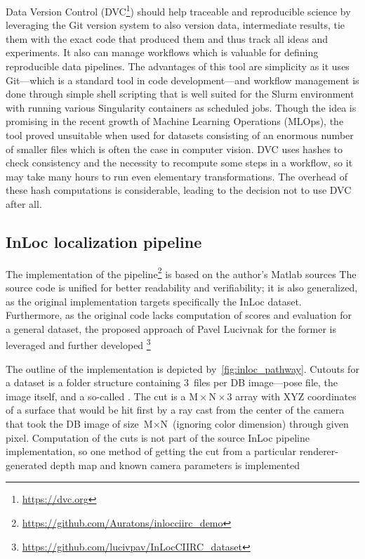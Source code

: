 Data Version Control (DVC\footnote{\url{https://dvc.org}}) should help traceable and
reproducible science by leveraging the Git version system to also version data,
intermediate results, tie them with the exact code that produced them and thus track all
ideas and experiments. It also can manage workflows which is valuable for defining
reproducible data pipelines. The advantages of this tool are simplicity as it uses
Git---which is a standard tool in code development---and workflow management is done
through simple shell scripting that is well suited for the Slurm environment with running
various Singularity containers as scheduled jobs. Though the idea is promising in the
recent growth of Machine Learning Operations (MLOps), the tool proved unsuitable when used
for datasets consisting of an enormous number of smaller files which is often the case in
computer vision. DVC uses hashes to check consistency and the necessity to recompute some
steps in a workflow, so it may take many hours to run even elementary transformations.
The overhead of these hash computations is considerable, leading to the decision not to
use DVC after all.

\subsection{InLoc localization pipeline}

The implementation of the
pipeline\footnote{\url{https://github.com/Auratons/inlocciirc_demo}} is based on the
author's Matlab sources The
source code is unified for better readability and verifiability; it is also generalized,
as the original implementation targets specifically the InLoc
dataset. Furthermore, as
the original code lacks computation of scores and evaluation for a general dataset, the
proposed approach of Pavel Lucivnak for the former is leveraged and further
developed
\footnote{\url{https://github.com/lucivpav/InLocCIIRC_dataset}}

The outline of the implementation is depicted by~\cref{fig:inloc_pathway}.  Cutouts for a
dataset is a folder structure containing 3~files per DB image---pose file, the image
itself, and a so-called . The cut is a $\text{M}\times\text{N}\times3$ array
with XYZ coordinates of a surface that would be hit first by a ray cast from the center of
the camera that took the DB image of size $\text{M}\times\text{N}$ (ignoring color
dimension) through given pixel.  Computation of the cuts is not part of the source InLoc
pipeline implementation, so one method of getting the cut from a particular
renderer-generated  depth map and known camera parameters is
implemented

